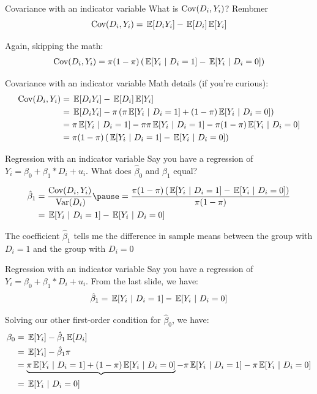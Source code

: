 \documentclass[aspectratio=169,t,11pt,table]{beamer}
\begin{document}
\begin{frame}{Covariance with an indicator variable}
  What is $\cov(D_i, Y_i)$? Rembmer
  $$
    \cov(D_i, Y_i) = \expec{D_i Y_i} - \expec{D_i} \expec{Y_i}
  $$
  
  \pause
  \bigskip
  Again, skipping the math:
  \begin{align*}
    \cov(D_i, Y_i) = \pi (1 - \pi) \left( \expec{Y_i}{D_i = 1} - \expec{Y_i}{D_i = 0} \right)
  \end{align*}
\end{frame}

\begin{frame}{Covariance with an indicator variable}
  Math details (if you're curious): 
  \begin{align*}
    \cov(D_i, Y_i) 
    &= \expec{D_i Y_i} - \expec{D_i} \expec{Y_i} \\
    &= \expec{D_i Y_i} - \pi \left( \pi \expec{Y_i}{D_i = 1} + (1 - \pi) \expec{Y_i}{D_i = 0} \right) \\
    &= \pi \expec{Y_i}{D_i = 1} - \pi \pi \expec{Y_i}{D_i = 1} - \pi (1 - \pi) \expec{Y_i}{D_i = 0} \\
    &= \pi (1 - \pi) \left( \expec{Y_i}{D_i = 1} - \expec{Y_i}{D_i = 0} \right)
  \end{align*}
\end{frame}

\begin{frame}{Regression with an indicator variable}
  Say you have a regression of $Y_i = \beta_0 + \beta_1 * D_i + u_i$. What does $\hat{\beta}_0$ and $\hat{\beta}_1$ equal?

  \begin{align*}
    \hat{\beta}_1 
    &= \frac{\cov(D_i, Y_i)}{\var{D_i}} \pause
    = \frac{\pi (1 - \pi) \left( \expec{Y_i}{D_i = 1} - \expec{Y_i}{D_i = 0} \right)}{\pi (1 - \pi)} \\
    &= \expec{Y_i}{D_i = 1} - \expec{Y_i}{D_i = 0}
  \end{align*}
  
  \bigskip
  The coefficient $\hat{\beta}_1$ tells me the difference in sample means between the group with $D_i = 1$ and the group with $D_i = 0$
\end{frame}

\begin{frame}{Regression with an indicator variable}
  Say you have a regression of $Y_i = \beta_0 + \beta_1 * D_i + u_i$. From the last slide, we have:
  $$ 
    \hat{\beta}_1 = \expec{Y_i}{D_i = 1} - \expec{Y_i}{D_i = 0} 
  $$

  \bigskip
  Solving our other first-order condition for $\hat{\beta}_0$, we have:
  \begin{align*}
    \beta_0 &= \expec{Y_i} - \hat{\beta}_1 \expec{D_i} \\
    &= \expec{Y_i} - \hat{\beta}_1 \pi \\
    &= \underbrace{\pi \expec{Y_i}{D_i = 1} + (1 - \pi) \expec{Y_i}{D_i = 0}} - \pi \expec{Y_i}{D_i = 1} - \pi \expec{Y_i}{D_i = 0} \\
    &= \expec{Y_i}{D_i = 0}
  \end{align*}
\end{frame}
\end{document}
